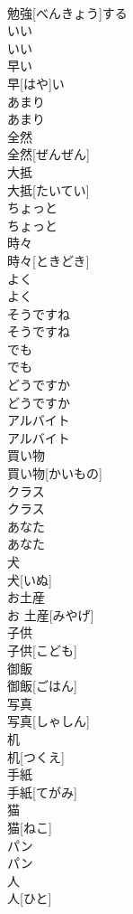 \documentclass[8pt]{extreport}
\begin{document}
\begin{CJK}{UTF8}{min}
\\	勉強[べんきょう]する
\\	いい	
\\	いい
\\	早い	
\\	早[はや]い
\\	あまり
\\	あまり
\\	全然	
\\	全然[ぜんぜん]
\\	大抵	
\\	大抵[たいてい]
\\	ちょっと	
\\	ちょっと
\\	時々	
\\	時々[ときどき]
\\	よく	
\\	よく
\\	そうですね	
\\	そうですね
\\	でも	
\\	でも
\\	どうですか	
\\	どうですか
\\	アルバイト	
\\	アルバイト
\\	買い物	
\\	買い物[かいもの]
\\	クラス	
\\	クラス
\\	あなた	
\\	あなた
\\	犬	
\\	犬[いぬ]
\\	お土産	
\\	お 土産[みやげ]
\\	子供	
\\	子供[こども]
\\	御飯	
\\	御飯[ごはん]
\\	写真	
\\	写真[しゃしん]
\\	机	
\\	机[つくえ]
\\	手紙	
\\	手紙[てがみ]
\\	猫	
\\	猫[ねこ]
\\	パン	
\\	パン
\\	人	
\\	人[ひと]

\end{CJK}
\end{document}
